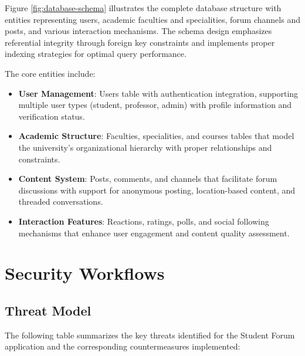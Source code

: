 Figure \ref{fig:database-schema} illustrates the complete database structure with entities representing users, academic faculties and specialities, forum channels and posts, and various interaction mechanisms. The schema design emphasizes referential integrity through foreign key constraints and implements proper indexing strategies for optimal query performance.

The core entities include:

\begin{itemize}
    \item \textbf{User Management}: Users table with authentication integration, supporting multiple user types (student, professor, admin) with profile information and verification status.
    \item \textbf{Academic Structure}: Faculties, specialities, and courses tables that model the university's organizational hierarchy with proper relationships and constraints.
    \item \textbf{Content System}: Posts, comments, and channels that facilitate forum discussions with support for anonymous posting, location-based content, and threaded conversations.
    \item \textbf{Interaction Features}: Reactions, ratings, polls, and social following mechanisms that enhance user engagement and content quality assessment.
\end{itemize}

\section{Security Workflows}

\subsection{Threat Model}

The following table summarizes the key threats identified for the Student Forum application and the corresponding countermeasures implemented:

